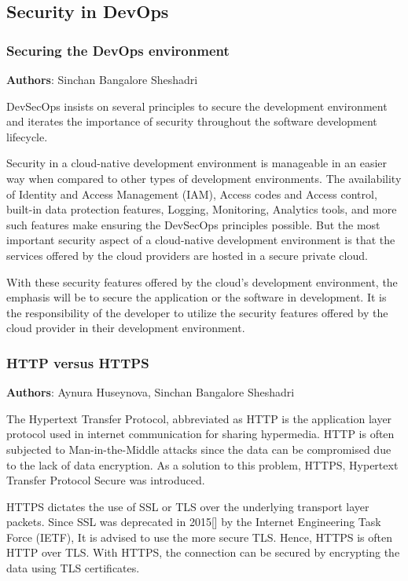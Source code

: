 \subsection{Security in DevOps}

\subsubsection{Securing the DevOps environment}
\textbf{Authors}: Sinchan Bangalore Sheshadri

DevSecOps insists on several principles to secure the development environment and iterates the importance of security throughout the software development lifecycle.

Security in a cloud-native development environment is manageable in an easier way when compared to other types of development environments. The availability of Identity and Access Management (IAM), Access codes and Access control, built-in data protection features, Logging, Monitoring, Analytics tools, and more such features make ensuring the DevSecOps principles possible. But the most important security aspect of a cloud-native development environment is that the services offered by the cloud providers are hosted in a secure private cloud.

With these security features offered by the cloud’s development environment, the emphasis will be to secure the application or the software in development. It is the responsibility of the developer to utilize the security features offered by the cloud provider in their development environment.


\subsubsection{HTTP versus HTTPS}
\textbf{Authors}: Aynura Huseynova, Sinchan Bangalore Sheshadri


The Hypertext Transfer Protocol, abbreviated as HTTP is the application layer protocol used in internet communication for sharing hypermedia. HTTP is often subjected to Man-in-the-Middle attacks since the data can be compromised due to the lack of data encryption. As a solution to this problem, HTTPS, Hypertext Transfer Protocol Secure was introduced.

HTTPS dictates the use of SSL or TLS over the underlying transport layer packets. Since SSL was deprecated in 2015[] by the Internet Engineering Task Force (IETF), It is advised to use the more secure TLS. Hence, HTTPS is often HTTP over TLS. With HTTPS, the connection can be secured by encrypting the data using TLS certificates.

